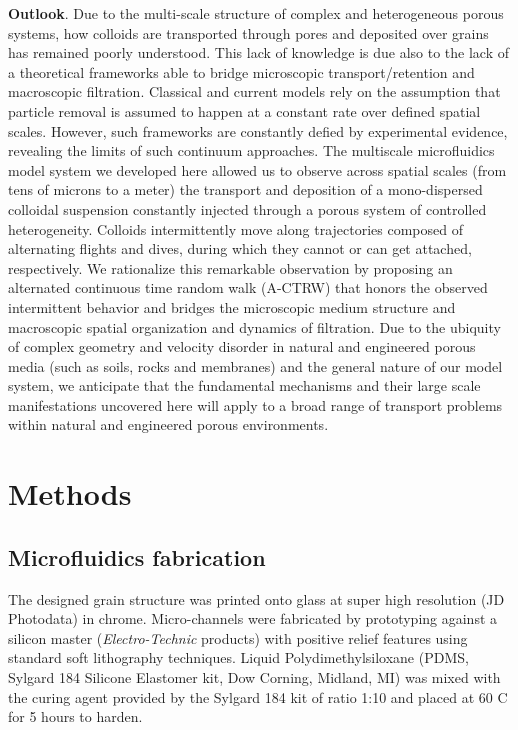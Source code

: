\documentclass[singlecolumn,pre,notitlepage,preprintnumbers,floatfix,superscriptaddress]{revtex4-1}
\begin{document}
\noindent
\textbf{Outlook}. Due to the multi-scale structure of complex and heterogeneous porous systems, how colloids are transported through pores and deposited over grains has remained poorly understood. This lack of knowledge is due also to the lack of a theoretical frameworks able to bridge microscopic transport/retention and macroscopic filtration. Classical and current models rely on the assumption that particle removal is assumed to happen at a constant rate over defined spatial scales. However, such frameworks are constantly defied by experimental evidence, revealing the limits of such continuum approaches. The multiscale microfluidics model system we developed here allowed us to observe across spatial scales (from tens of microns to a meter) the transport and deposition of a mono-dispersed colloidal suspension constantly injected through a porous system of controlled heterogeneity. Colloids intermittently move along trajectories composed of alternating flights and dives, during which they cannot or can get attached, respectively. We rationalize this remarkable observation by proposing an alternated continuous time random walk (A-CTRW) that honors the observed intermittent behavior and bridges the microscopic medium structure and macroscopic spatial organization and dynamics of filtration. Due to the ubiquity of complex geometry and velocity disorder in natural and engineered porous media (such as soils, rocks and membranes) and the general nature of our model system, we anticipate that the fundamental mechanisms and their large scale manifestations uncovered here will apply to a broad range of transport problems within natural and engineered porous environments.

\noindent
\section{Methods}

\subsection*{Microfluidics fabrication}
\noindent
The designed grain structure was printed onto glass at super high resolution (JD Photodata) in chrome. Micro-channels were fabricated by prototyping against a silicon master (\emph{Electro-Technic} products) with positive relief features using standard soft lithography techniques. Liquid Polydimethylsiloxane (PDMS, Sylgard 184 Silicone Elastomer kit, Dow Corning, Midland, MI) was mixed with the curing agent provided by the Sylgard 184 kit of ratio 1:10 and placed at 60 \textdegree C for 5 hours to harden. \\
\end{document}
